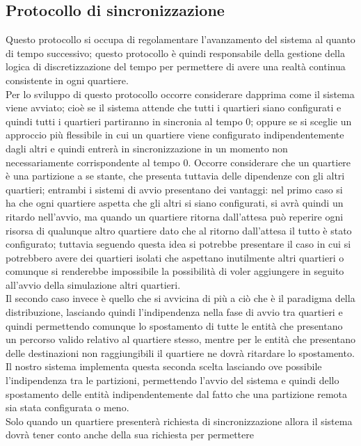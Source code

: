 \subsection{Protocollo di sincronizzazione}
\label{protosynch}
Questo protocollo si occupa di regolamentare l'avanzamento del sistema al
quanto di tempo successivo; questo protocollo è quindi responsabile della
gestione della logica di discretizzazione del tempo per permettere di avere una
realtà continua consistente in ogni quartiere.\\
Per lo sviluppo di questo protocollo occorre considerare dapprima come il
sistema viene avviato; cioè se il sistema attende che tutti i quartieri siano
configurati e quindi tutti i quartieri partiranno in sincronia al tempo 0;
oppure se si sceglie un approccio più flessibile in cui un quartiere viene
configurato indipendentemente dagli altri e quindi entrerà in sincronizzazione
in un momento non necessariamente corrispondente al tempo 0. Occorre
considerare che un quartiere è una partizione a se stante, che presenta
tuttavia delle dipendenze con gli altri quartieri; entrambi i sistemi di avvio
presentano dei vantaggi: nel primo caso si ha che ogni quartiere aspetta che
gli altri si siano configurati, si avrà quindi un ritardo nell'avvio, ma quando
un quartiere ritorna dall'attesa può reperire ogni risorsa di qualunque altro
quartiere dato che al ritorno dall'attesa il tutto è stato configurato;
tuttavia seguendo questa idea si potrebbe presentare il caso in cui si
potrebbero avere dei quartieri isolati che aspettano inutilmente altri
quartieri o comunque si renderebbe impossibile la possibilità di voler
aggiungere in seguito all'avvio della simulazione altri quartieri.\\
Il secondo caso invece è quello che si avvicina di più a ciò che è il paradigma
della distribuzione, lasciando quindi l'indipendenza nella fase di avvio tra
quartieri e quindi permettendo comunque lo spostamento di tutte le entità che
presentano un percorso valido relativo al quartiere stesso, mentre per le
entità che presentano delle destinazioni non raggiungibili il quartiere ne
dovrà ritardare lo spostamento. Il nostro sistema implementa questa seconda
scelta lasciando ove possibile l'indipendenza tra le partizioni, permettendo
l'avvio del sistema e quindi dello spostamento delle entità indipendentemente
dal fatto che una partizione remota sia stata configurata o meno.\\
Solo quando un quartiere presenterà richiesta di sincronizzazione allora il
sistema dovrà tener conto anche della sua richiesta per permettere
